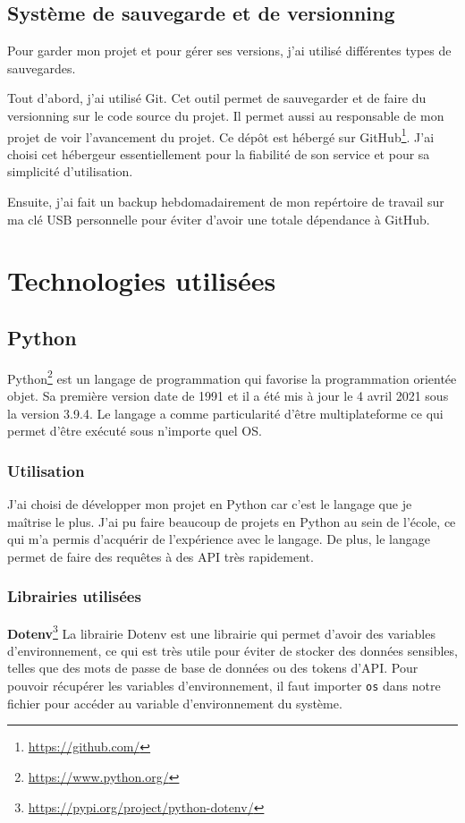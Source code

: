 \documentclass[a4paper,14pt]{extarticle}
\begin{document}
{\subsection{Système de sauvegarde et de versionning}

Pour garder mon projet et pour gérer ses versions, j'ai utilisé différentes types de sauvegardes.

Tout d'abord, j'ai utilisé Git. Cet outil permet de sauvegarder et de faire du versionning sur le code source du projet. Il permet aussi au responsable de mon projet de voir l'avancement du projet. Ce dépôt est hébergé sur GitHub\footnote{\url{https://github.com/}}. J'ai choisi cet hébergeur essentiellement pour la fiabilité de son service et pour sa simplicité d'utilisation. 

Ensuite, j'ai fait un backup hebdomadairement de mon repértoire de travail sur ma clé USB personnelle pour éviter d'avoir une totale dépendance à GitHub. 

\section{Technologies utilisées}

\subsection{Python}
Python\footnote{\url{https://www.python.org/}} est un langage de programmation qui favorise la programmation orientée objet. Sa première version date de 1991 et il a été mis à jour le 4 avril 2021 sous la version 3.9.4. Le langage a comme particularité d'être multiplateforme ce qui permet d'être exécuté sous n'importe quel OS.

\subsubsection{Utilisation}
J'ai choisi de développer mon projet en Python car c'est le langage que je maîtrise le plus. J'ai pu faire beaucoup de projets en Python au sein de l'école, ce qui m'a permis d'acquérir de l'expérience avec le langage. De plus, le langage permet de faire des requêtes à des API très rapidement.

\subsubsection{Librairies utilisées}

\noindent\textbf{Dotenv}\footnote{\url{https://pypi.org/project/python-dotenv/}}
La librairie Dotenv est une librairie qui permet d'avoir des variables d'environnement, ce qui est très utile pour éviter de stocker des données sensibles, telles que des mots de passe de base de données ou des tokens d'API. Pour pouvoir récupérer les variables d'environnement, il faut importer \texttt{os} dans notre fichier pour accéder au variable d'environnement du système.

}
\end{document}
